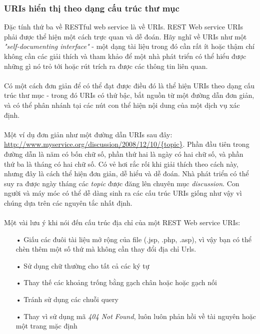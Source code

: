 \documentclass[a4paper]{article}
\begin{document}
\subsubsection{URIs hiển thị theo dạng cấu trúc thư mục}
Đặc tính thứ ba về RESTful web service là về URIs. REST Web service URIs phải được thể hiện một cách trực quan và dễ đoán. Hãy nghĩ về URIs như một \textit{"self-documenting interface"} - một dạng tài liệu trong đó cần rất ít hoặc thậm chí không cần các giải thích và tham khảo để một nhà phát triển có thể hiểu được những gì nó trỏ tới hoặc rút trích ra được các thông tin liên quan.\\
\\
Có một cách đơn giản để có thể đạt được điều đó là thể hiện URIs theo dạng cấu trúc thư mục - trong đó URIs có thứ bậc, bắt nguồn từ một đường dẫn đơn giản, và có thể phân nhánh tại các nút con thể hiện nội dung của một dịch vụ xác định.\\
\\
Một ví dụ đơn giản như một đường dẫn URIs sau đây:
\url{http://www.myservice.org/discussion/2008/12/10/{topic}}. Phần đầu tiên trong đường dẫn là năm có bốn chữ số, phần thứ hai là ngày có hai chữ số, và phần thứ ba là tháng có hai chữ số. Có vẻ hơi rắc rối khi giải thích theo cách này, nhưng đây là cách thể hiện đơn giản, dễ hiểu và dễ đoán. Nhà phát triển có thể suy ra được ngày tháng các \textit{topic} được đăng lên chuyên mục \textit{discussion}. Con người và máy móc có thể dễ dàng sinh ra các cấu trúc URIs giống như vậy vì chúng dựa trên các nguyên tắc nhất định.\\
\\
Một vài lưu ý khi nói đến cấu trúc địa chỉ của một REST Web service URIs:
\begin{itemize}
	\item[•]Giấu các đuôi tài liệu mở rộng của file (.jsp, .php, .asp), vì vậy bạn có thể chèn thêm một số thứ mà không cần thay đổi địa chỉ Urls.
	\item[•]Sử dụng chữ thường cho tất cả các ký tự
	\item[•]Thay thế các khoảng trống bằng gạch chân hoặc hoặc gạch nối 
	\item[•]Tránh sử dụng các chuỗi query 
	\item[•]Thay vì sử dụng mã \textit{404 Not Found}, luôn luôn phản hồi về tài nguyên hoặc một trang mặc định 
\end{itemize}
\end{document}
